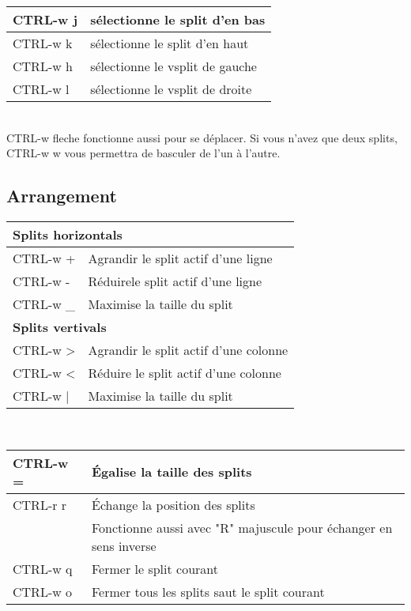 \documentclass{article}
\begin{document}
\begin{tabular}{|p{3cm}| l|  }\hline
CTRL-w j & sélectionne le split d'en bas\\ \hline
CTRL-w k & sélectionne le split d'en haut\\ \hline
CTRL-w h & sélectionne le vsplit de gauche\\ \hline
CTRL-w l & sélectionne le vsplit de droite\\ \hline
\end{tabular}\\

\noindent
 CTRL-w fleche fonctionne aussi pour se déplacer. Si vous n'avez que deux splits, CTRL-w w vous permettra de basculer de l'un à l'autre.
\subsection{Arrangement}

\begin{tabular}{|p{3cm}| l|  }\hline
\multicolumn{2}{|l|}{\textbf{Splits horizontals}} \\ \hline
    CTRL-w + & Agrandir le split actif d'une ligne\\ \hline
    CTRL-w - & Réduirele split actif d'une ligne\\ \hline
    CTRL-w \_ & Maximise la taille du split\\ \hline
\multicolumn{2}{|l|}{\textbf{Splits vertivals}}\\ \hline
    CTRL-w > & Agrandir le split actif d'une colonne \\ \hline
    CTRL-w < & Réduire le split actif d'une colonne \\ \hline
    CTRL-w | & Maximise la taille du split\\ \hline
\end{tabular}\\[1.5em]


\begin{tabular}{|p{3cm}| l|  }\hline
    CTRL-w = & Égalise la taille des splits \\ \hline
    CTRL-r r & Échange la position des splits\\
    & Fonctionne aussi avec "R" majuscule pour échanger en sens inverse \\ \hline
    CTRL-w q & Fermer le split courant \\ \hline
    CTRL-w o & Fermer tous les splits saut le split courant \\ \hline
\end{tabular}\\
\end{document}
